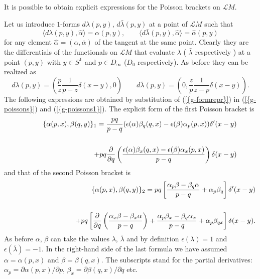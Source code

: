 \documentclass[numbook, envcountsame, envcountreset]{svjour3}
\begin{document}
It is possible to obtain explicit expressions for the Poisson brackets on ${{\mathcal L}} M$. 

Let us introduce $1$-forms $d{\lambda}(p,y)$, $d\bar{\lambda}(p,y)$ at a point of  ${{\mathcal L}} M$ such that 
\begin{equation}
\langle d{\lambda}(p,y), \hat\alpha \rangle = \alpha(p,y), \qquad \langle d \bar{\lambda} (p,y) , \hat\alpha \rangle = \hat\alpha(p,y)
\end{equation}
for any element $\hat\alpha=( \alpha,\bar\alpha)$ of the tangent at the same point. 
Clearly they are the differentials of the functionals on ${{\mathcal L}} M$ that evaluate ${\lambda}$ (  $\bar{\lambda}$ respectively ) at a point $(p,y)$ with $y \in S^1$ and $p \in D_{\infty}$ ($D_0$ respectively). As before they can be realized as
\begin{equation} \label{g-formrepr}
d{\lambda}(p,y) = \left( \frac{p}{z} \frac1{p-z} {\delta}(x-y),0 \right) \qquad d \bar{\lambda}(p,y) = \left(0, \frac{z}{p} \frac1{z-p} {\delta}(x-y) \right) .
\end{equation} 
The following expressions are obtained by substitution of {(\ref{{g-formrepr}})} in {(\ref{{g-poissons}})} and {(\ref{{g-poissons1}})}. The explicit form of the first Poisson bracket is
\begin{eqnarray}\label{first}
&&
\{ \alpha(p,x) , \beta(q,y) \}_1 = \frac{pq}{p-q}(\epsilon(\alpha)\beta_q(q,x)-\epsilon(\beta)\alpha_p(p,x)  ) {\delta}'(x-y) 
{\nonumber}\\
&&
\\
&&
\quad\quad \quad\quad \quad\quad \quad\quad \quad   +pq \frac{\partial}{{\partial} q}\left( \frac{\epsilon(\alpha)\beta_x (q,x)-\epsilon(\beta)\alpha_x(p,x) }{p-q}  \right) {\delta}(x-y)  
{\nonumber}
\end{eqnarray}
and that of the second Poisson bracket is
\begin{eqnarray}
&&
\{ \alpha(p,x) , \beta(q,y) \}_2 =pq \left[ \frac{ \alpha_p \beta - \beta_q \alpha  }{p-q}+  \alpha_p \beta_q \right] {\delta}'(x-y) 
{\nonumber}\\
&&
\\
&&
\quad\quad \quad\quad \quad\quad \quad\quad \quad +pq \left[  \frac{\partial}{{\partial} q} \left( \frac{\alpha_x \beta - \beta_x \alpha}{p-q} \right) + \frac{\alpha_p \beta_x - \beta_q \alpha_x}{p-q} + \alpha_p \beta_{qx}  
\right] {\delta}(x-y) .
{\nonumber}
\end{eqnarray}
As before $\alpha$, $\beta$ can take the values ${\lambda}$, $\bar{\lambda}$ and by definition $\epsilon({\lambda})=1$ and $\epsilon(\bar{\lambda})=-1$. In the right-hand side of the last formula we have assumed $\alpha=\alpha(p,x)$ and $\beta=\beta(q,x)$. The subscripts stand for the partial derivatives:
$\alpha_p={\partial}\alpha(p,x)/{\partial} p$, $\beta_x={\partial}\beta(q,x)/{\partial} q$ etc.
	
\end{document}
